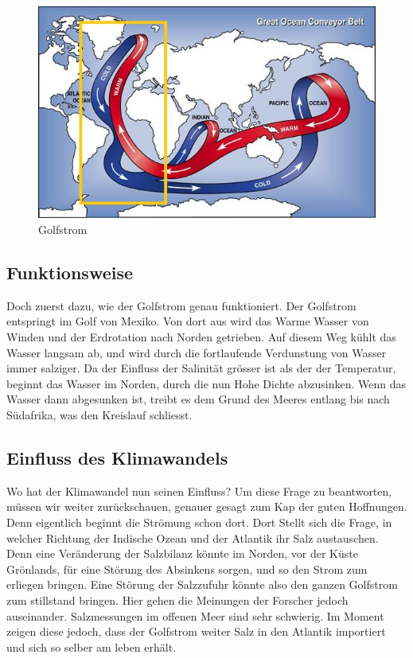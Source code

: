 \begin{figure}[H]
	\includegraphics[width=12cm]{thermohalin/Bilder/Deep-Ocean-Currents.jpg}
	\centering
	\caption{Golfstrom}
\end{figure}



\subsection{Funktionsweise}

Doch zuerst dazu, wie der Golfstrom genau funktioniert.
Der Golfstrom entspringt im Golf von Mexiko. Von dort aus wird das Warme Wasser von Winden und der Erdrotation nach Norden getrieben.
Auf diesem Weg kühlt das Wasser langsam ab, und wird durch die fortlaufende Verdunstung von Wasser immer salziger. Da der Einfluss der Salinität grösser ist als der der Temperatur, beginnt das Wasser im Norden, durch die nun Hohe Dichte abzusinken. Wenn das Wasser dann abgesunken ist, treibt es dem Grund des Meeres entlang bis nach Südafrika, was den Kreislauf schliesst.

\subsection{Einfluss des Klimawandels} 
Wo hat der Klimawandel nun seinen Einfluss?
Um diese Frage zu beantworten, müssen wir weiter zurückschauen, genauer gesagt zum Kap der guten Hoffnungen. Denn eigentlich beginnt die Strömung schon dort. 
Dort Stellt sich die Frage, in welcher Richtung der Indische Ozean und der Atlantik ihr Salz austauschen. 
Denn eine Veränderung der Salzbilanz könnte im Norden, vor der Küste Grönlands, für eine Störung des Absinkens sorgen, und so den Strom zum erliegen bringen. 
Eine Störung der Salzzufuhr könnte also den ganzen Golfstrom zum stillstand bringen.
Hier gehen die Meinungen der Forscher jedoch auseinander. Salzmessungen im offenen Meer sind sehr schwierig. 
Im Moment zeigen diese jedoch, dass der Golfstrom weiter Salz in den Atlantik importiert und sich so selber am leben erhält.

